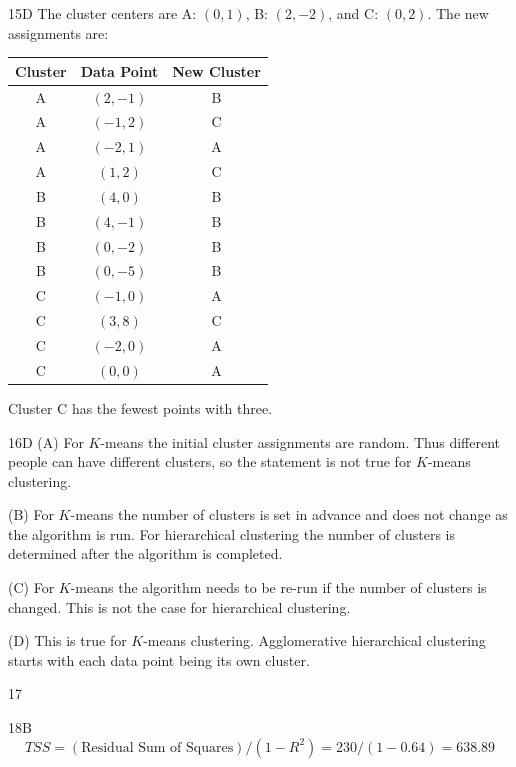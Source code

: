 \begin{solution}{15}{D}
The cluster centers are A: $(0, 1)$, B: $(2, -2)$, and C: $(0, 2)$. The new assignments are:
\begin{center}
\begin{tabular}{|c|c|c|}
\hline
Cluster & Data Point & New Cluster \\ \hline
A & $(2, -1)$  & B \\ \hline
A & $(-1, 2)$  & C \\ \hline
A & $(-2, 1)$  & A \\ \hline
A & $(1, 2)$   & C \\ \hline
B & $(4, 0)$   & B \\ \hline
B & $(4, -1)$  & B \\ \hline
B & $(0, -2)$  & B \\ \hline
B & $(0, -5)$  & B \\ \hline
C & $(-1, 0)$  & A \\ \hline
C & $(3, 8)$   & C \\ \hline
C & $(-2, 0)$  & A \\ \hline
C & $(0, 0)$   & A \\ \hline
\end{tabular}
\end{center}
Cluster C has the fewest points with three.
\end{solution}

\begin{solution}{16}{D}
(A) For $K$-means the initial cluster assignments are random. Thus different people can have different clusters, so the statement is not true for $K$-means clustering.

(B) For $K$-means the number of clusters is set in advance and does not change as the algorithm is run. For hierarchical clustering the number of clusters is determined after the algorithm is completed.

(C) For $K$-means the algorithm needs to be re-run if the number of clusters is changed. This is not the case for hierarchical clustering.

(D) This is true for $K$-means clustering. Agglomerative hierarchical clustering starts with each data point being its own cluster.
\end{solution}

\begin{solution}{17}{}
\deleted
\end{solution}

\begin{solution}{18}{B}
\[ TSS = (\text{Residual Sum of Squares})/(1 - R^2) = 230/(1 - 0.64) = 638.89 \]
\end{solution}

